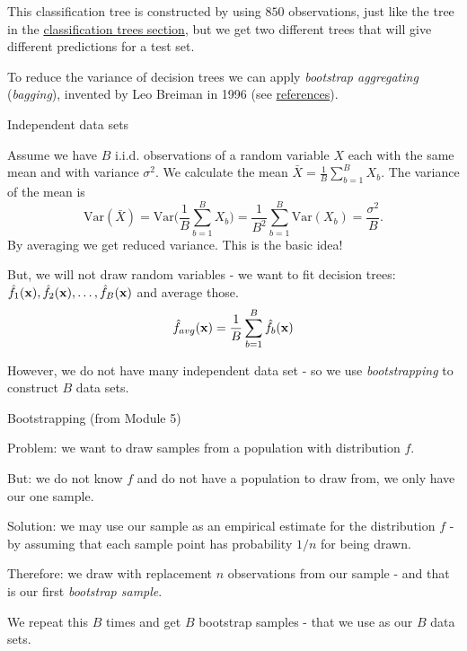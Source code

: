 \documentclass[ignorenonframetext,]{beamer}
\begin{document}
\begin{frame}

This classification tree is constructed by using \(850\) observations,
just like the tree in the \protect\hyperlink{classtree2}{classification
trees section}, but we get two different trees that will give different
predictions for a test set.

To reduce the variance of decision trees we can apply \emph{bootstrap
aggregating} (\emph{bagging}), invented by Leo Breiman in 1996 (see
\protect\hyperlink{ref}{references}).

\end{frame}

\begin{frame}

\begin{block}{Independent data sets}

Assume we have \(B\) i.i.d. observations of a random variable \(X\) each
with the same mean and with variance \(\sigma^2\). We calculate the mean
\(\bar{X} = \frac{1}{B} \sum_{b=1}^B X_b\). The variance of the mean is
\[\text{Var}(\bar{X}) = \text{Var}\Big(\frac{1}{B}\sum_{b=1}^B X_b \Big) = \frac{1}{B^2} \sum_{b=1}^B \text{Var}(X_b) = \frac{\sigma^2}{B}.\]
By averaging we get reduced variance. This is the basic idea!

But, we will not draw random variables - we want to fit decision trees:
\(\hat{f}_1({\bf x}),\hat{f}_2({\bf x}),\ldots, \hat{f}_B({\bf x})\) and
average those.
\[ \hat{f}_{avg}({\bf x})=\frac{1}{B}\sum_{b=1}^B \hat{f}_b({\bf x})\]

However, we do not have many independent data set - so we use
\emph{bootstrapping} to construct \(B\) data sets.

\end{block}

\end{frame}

\begin{frame}

\begin{block}{Bootstrapping (from Module 5)}

Problem: we want to draw samples from a population with distribution
\(f\).

But: we do not know \(f\) and do not have a population to draw from, we
only have our one sample.

Solution: we may use our sample as an empirical estimate for the
distribution \(f\) - by assuming that each sample point has probability
\(1/n\) for being drawn.

Therefore: we draw with replacement \(n\) observations from our sample -
and that is our first \emph{bootstrap sample}.

We repeat this \(B\) times and get \(B\) bootstrap samples - that we use
as our \(B\) data sets.

\end{block}

\end{frame}
\end{document}
